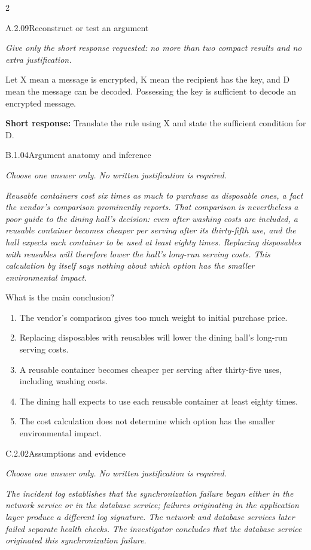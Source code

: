 \documentclass[9pt]{extarticle}
\newcommand{\choice}[1]{\item #1}
\begin{document}
\begin{multicols}{2}
\begin{DenseCoreProblem}{A.2.09}{Reconstruct or test an argument}
{\scriptsize\textit{Give only the short response requested: no more than two compact results and no extra justification.}\par}
Let X mean a message is encrypted, K mean the recipient has the key, and D mean the message can be decoded. Possessing the key is sufficient to decode an encrypted message.

\textbf{Short response:} Translate the rule using X and state the sufficient condition for D.
\end{DenseCoreProblem}
\begin{DenseCoreProblem}{B.1.04}{Argument anatomy and inference}
{\scriptsize\textit{Choose one answer only. No written justification is required.}\par}
\emph{Reusable containers cost six times as much to purchase as disposable ones, a fact the vendor's comparison prominently reports. That comparison is nevertheless a poor guide to the dining hall's decision: even after washing costs are included, a reusable container becomes cheaper per serving after its thirty-fifth use, and the hall expects each container to be used at least eighty times. Replacing disposables with reusables will therefore lower the hall's long-run serving costs. This calculation by itself says nothing about which option has the smaller environmental impact.}

What is the main conclusion?
\begin{enumerate}[label=(\alph*)]
  \choice{The vendor's comparison gives too much weight to initial purchase price.}
  \choice{Replacing disposables with reusables will lower the dining hall's long-run serving costs.}
  \choice{A reusable container becomes cheaper per serving after thirty-five uses, including washing costs.}
  \choice{The dining hall expects to use each reusable container at least eighty times.}
  \choice{The cost calculation does not determine which option has the smaller environmental impact.}
\end{enumerate}
\end{DenseCoreProblem}
\columnbreak
\begin{DenseCoreProblem}{C.2.02}{Assumptions and evidence}
{\scriptsize\textit{Choose one answer only. No written justification is required.}\par}
\emph{The incident log establishes that the synchronization failure began either in the network service or in the database service; failures originating in the application layer produce a different log signature. The network and database services later failed separate health checks. The investigator concludes that the database service originated this synchronization failure.}


\end{DenseCoreProblem}
\end{multicols}
\end{document}
